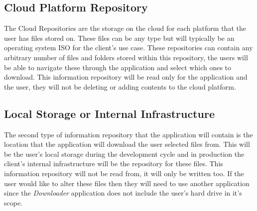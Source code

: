 \documentclass{article}
\begin{document}
    \subsection{Cloud Platform Repository}
    The Cloud Repositories are the storage on the cloud for each platform that the user has files stored on.
    These files can be any type but will typically be an operating system ISO for the client's use case. These
    repositories can contain any arbitrary number of files and folders stored within this repository, the users
    will be able to navigate these through the application and select which ones to download. This information repository
    will be read only for the application and the user, they will not be deleting or adding contents to the cloud platform.
    
    \subsection{Local Storage or Internal Infrastructure}
    The second type of information repository that the application will contain is the location that the
    application will download the user selected files from. This will be the user's local storage during the
    development cycle and in production the client's internal infrastructure will be the repository for these
    files. This information repository will not be read from, it will only be written too. If the user would like to alter
    these files then they will need to use another application since the \textit{Downloader} application does not
    include the user's hard drive in it's scope.
\end{document}
